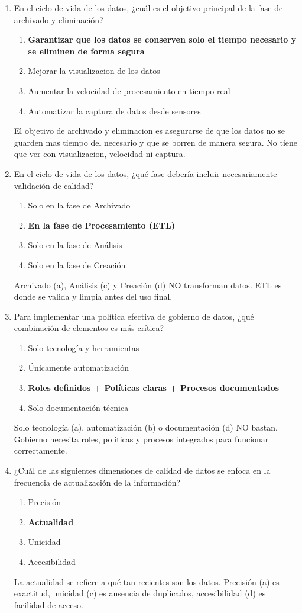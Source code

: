 \documentclass[12pt]{article}
\begin{document}
\begin{enumerate}[label=\arabic*.]
\item En el ciclo de vida de los datos, ¿cuál es el objetivo principal de la fase de archivado y eliminación?
\begin{enumerate}
    \item \textbf{Garantizar que los datos se conserven solo el tiempo necesario y se eliminen de forma segura}
    \item Mejorar la visualizacion de los datos
    \item Aumentar la velocidad de procesamiento en tiempo real
    \item Automatizar la captura de datos desde sensores
\end{enumerate}
El objetivo de archivado y eliminacion es asegurarse de que los datos no se guarden mas tiempo del necesario y que se borren de manera segura. No tiene que ver con visualizacion, velocidad ni captura.

\item En el ciclo de vida de los datos, ¿qué fase debería incluir necesariamente validación de calidad?
\begin{enumerate}
    \item Solo en la fase de Archivado
    \item \textbf{En la fase de Procesamiento (ETL)}
    \item Solo en la fase de Análisis
    \item Solo en la fase de Creación
\end{enumerate}
Archivado (a), Análisis (c) y Creación (d) NO transforman datos. ETL es donde se valida y limpia antes del uso final.

\item Para implementar una política efectiva de gobierno de datos, ¿qué combinación de elementos es más crítica?
\begin{enumerate}
    \item Solo tecnología y herramientas
    \item Únicamente automatización
    \item \textbf{Roles definidos + Políticas claras + Procesos documentados}
    \item Solo documentación técnica
\end{enumerate}
Solo tecnología (a), automatización (b) o documentación (d) NO bastan. Gobierno necesita roles, políticas y procesos integrados para funcionar correctamente.

\item ¿Cuál de las siguientes dimensiones de calidad de datos se enfoca en la frecuencia de actualización de la información?
\begin{enumerate}
    \item Precisión
    \item \textbf{Actualidad}
    \item Unicidad
    \item Accesibilidad
\end{enumerate}
La actualidad se refiere a qué tan recientes son los datos. Precisión (a) es exactitud, unicidad (c) es ausencia de duplicados, accesibilidad (d) es facilidad de acceso.


\end{enumerate}
\end{document}
